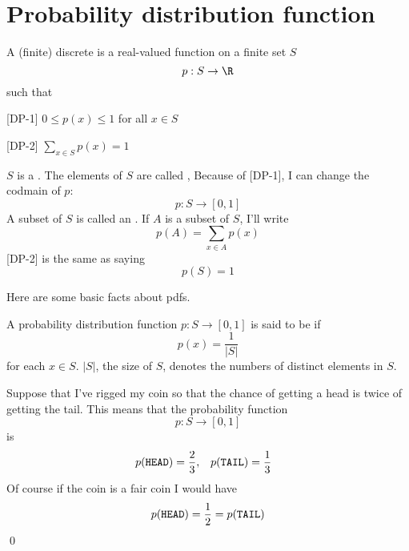 \section{Probability distribution function}

A (finite) discrete 
 is
a 
real-valued function on a finite set $S$ 
\[
p : S \rightarrow \R
\]
such that 
\begin{axioms}
\item[{[DP-1]}] $0 \leq p(x) \leq 1$ for all $x \in S$
\item[{[DP-2]}] $\sum_{x \in S} p(x) = 1$
\end{axioms}
$S$ is a
.
The elements of $S$ are called
,
Because of [DP-1], I can change the codmain of $p$:
\[
p : S \rightarrow [0,1]
\]
A subset of $S$ is called an .
If $A$ is a subset of $S$, I'll write
\[
p(A) = \sum_{x \in A} p(x)
\]
[DP-2] is the same as saying
\[
p(S) = 1
\]

Here are some basic facts about pdfs.





\begin{defn}
A probability distribution function $p : S \rightarrow [0,1]$ 
is said to be  if
\[
p(x) = \frac{1}{|S|}
\]
for each $x \in S$.
$|S|$, the size of $S$, denotes the numbers of distinct elements in $S$.
\end{defn}

\begin{eg}
Suppose that I've rigged my coin so that the chance of getting
a head is twice of getting the tail.
This means that the probability function
\[
p : S \rightarrow [0,1]
\]
is
\[
p(\texttt{HEAD}) = \frac{2}{3}, \,\,\,\,\,
p(\texttt{TAIL}) = \frac{1}{3} \,\,\,\,\,
\]
Of course if the coin is a fair coin I would have
\[
p(\texttt{HEAD}) = \frac{1}{2} = p(\texttt{TAIL})
\]
\qed
\end{eg}





